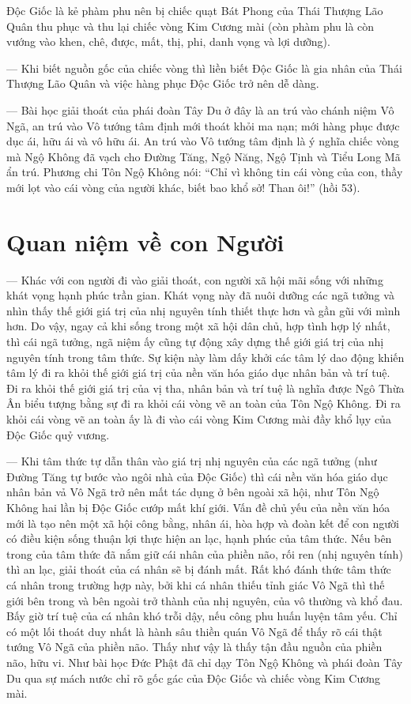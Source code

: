Độc Giốc là kẻ phàm phu nên bị chiếc quạt Bát Phong của Thái Thượng Lão Quân thu phục và thu lại chiếc vòng Kim Cương mài (còn phàm phu là còn vướng vào khen, chê, được, mất, thị, phi, danh vọng và lợi dưỡng).

— Khi biết nguồn gốc của chiếc vòng thì liền biết Độc Giốc là gia nhân của Thái Thượng Lão Quân và việc hàng phục Độc Giốc trở nên dễ dàng.

— Bài học giải thoát của phái đoàn Tây Du ở đây là an trú vào chánh niệm Vô Ngã, an trú vào Vô tướng tâm định mới thoát khỏi ma nạn; mới hàng phục được dục ái, hữu ái và vô hữu ái. An trú vào Vô tướng tâm định là ý nghĩa chiếc vòng mà Ngộ Không đã vạch cho Đường Tăng, Ngộ Năng, Ngộ Tịnh và Tiểu Long Mã ẩn trú. Phương chi Tôn Ngộ Không nói: ``Chỉ vì không tin cái vòng của con, thầy mới lọt vào cái vòng của người khác, biết bao khổ sở! Than ôi!'' (hồi 53).

\section{Quan niệm về con Người} %
\label{sec:50_51_con_nguoi}

— Khác với con người đi vào giải thoát, con người xã hội mãi sống với những khát vọng hạnh phúc trần gian. Khát vọng này đã nuôi dưỡng các ngã tưởng và nhìn thấy thế giới giá trị của nhị nguyên tính thiết thực hơn và gần gũi với mình hơn. Do vậy, ngay cả khi sống trong một xã hội dân chủ, hợp tình hợp lý nhất, thì cái ngã tưởng, ngã niệm ấy cũng tự động xây dựng thế giới giá trị của nhị nguyên tính trong tâm thức. Sự kiện này làm dấy khởi các tâm lý dao động khiến tâm lý đi ra khỏi thế giới giá trị của nền văn hóa giáo dục nhân bản và trí tuệ. Đi ra khỏi thế giới giá trị của vị tha, nhân bản và trí tuệ là nghĩa được Ngô Thừa Ân biểu tượng bằng sự đi ra khỏi cái vòng vẽ an toàn của Tôn Ngộ Không. Đi ra khỏi cái vòng vẽ an toàn ấy là đi vào cái vòng Kim Cương mài đầy khổ lụy của Độc Giốc quỷ vương.

— Khi tâm thức tự dẫn thân vào giá trị nhị nguyên của các ngã tưởng (như Đường Tăng tự bước vào ngôi nhà của Độc Giốc) thì cái nền văn hóa giáo dục nhân bản vả Vô Ngã trở nên mất tác dụng ở bên ngoài xã hội, như Tôn Ngộ Không hai lần bị Độc Giốc cướp mất khí giới. Vấn đề chủ yếu của nền văn hóa mới là tạo nên một xã hội công bằng, nhân ái, hòa hợp và đoàn kết để con người có điều kiện sống thuận lợi thực hiện an lạc, hạnh phúc của tâm thức. Nếu bên trong của tâm thức đã nắm giữ cái nhân của phiền não, rối ren (nhị nguyên tính) thì an lạc, giải thoát của cá nhân sẽ bị đánh mất. Rất khó đánh thức tâm thức cá nhân trong trường hợp này, bởi khi cá nhân thiếu tỉnh giác Vô Ngã thì thế giới bên trong và bên ngoài trở thành của nhị nguyên, của vô thường và khổ đau. Bấy giờ trí tuệ của cá nhân khó trỗi dậy, nếu công phu huấn luyện tâm yếu. Chỉ có một lối thoát duy nhất là hành sâu thiền quán Vô Ngã để thấy rõ cái thật tướng Vô Ngã của phiền não. Thấy như vậy là thấy tận đầu nguồn của phiền não, hữu vi. Như bài học Đức Phật đã chỉ dạy Tôn Ngộ Không và phái đoàn Tây Du qua sự mách nước chỉ rõ gốc gác của Độc Giốc và chiếc vòng Kim Cương mài.

